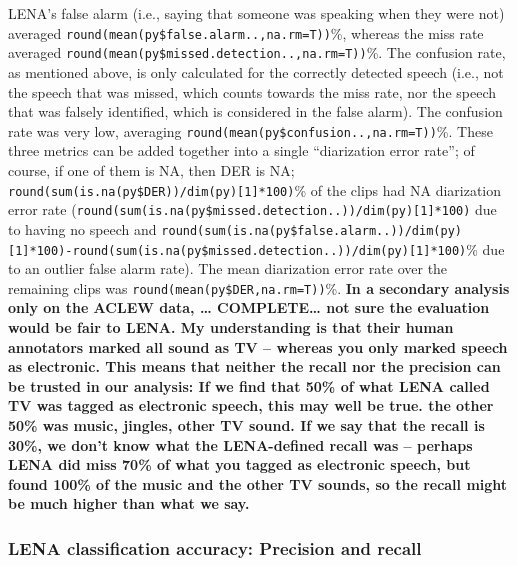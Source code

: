 \documentclass[english,floatsintext,man]{apa6}
\begin{document}
LENA's false alarm (i.e., saying that someone was speaking when they
were not) averaged \texttt{round(mean(py\$false.alarm..,na.rm=T))}\%,
whereas the miss rate averaged
\texttt{round(mean(py\$missed.detection..,na.rm=T))}\%. The confusion
rate, as mentioned above, is only calculated for the correctly detected
speech (i.e., not the speech that was missed, which counts towards the
miss rate, nor the speech that was falsely identified, which is
considered in the false alarm). The confusion rate was very low,
averaging \texttt{round(mean(py\$confusion..,na.rm=T))}\%. These three
metrics can be added together into a single \enquote{diarization error
rate}; of course, if one of them is NA, then DER is NA;
\texttt{round(sum(is.na(py\$DER))/dim(py){[}1{]}*100)}\% of the clips
had NA diarization error rate
(\texttt{round(sum(is.na(py\$missed.detection..))/dim(py){[}1{]}*100)}
due to having no speech and
\texttt{round(sum(is.na(py\$false.alarm..))/dim(py){[}1{]}*100)-round(sum(is.na(py\$missed.detection..))/dim(py){[}1{]}*100)}\%
due to an outlier false alarm rate). The mean diarization error rate
over the remaining clips was \texttt{round(mean(py\$DER,na.rm=T))}\%.
\textbf{In a secondary analysis only on the ACLEW data, \ldots{}
COMPLETE\ldots{} not sure the evaluation would be fair to LENA. My
understanding is that their human annotators marked all sound as TV --
whereas you only marked speech as electronic. This means that neither
the recall nor the precision can be trusted in our analysis: If we find
that 50\% of what LENA called TV was tagged as electronic speech, this
may well be true. the other 50\% was music, jingles, other TV sound. If
we say that the recall is 30\%, we don't know what the LENA-defined
recall was -- perhaps LENA did miss 70\% of what you tagged as
electronic speech, but found 100\% of the music and the other TV sounds,
so the recall might be much higher than what we say.}

\subsubsection{LENA classification accuracy: Precision and
recall}\label{lena-classification-accuracy-precision-and-recall}
\end{document}
